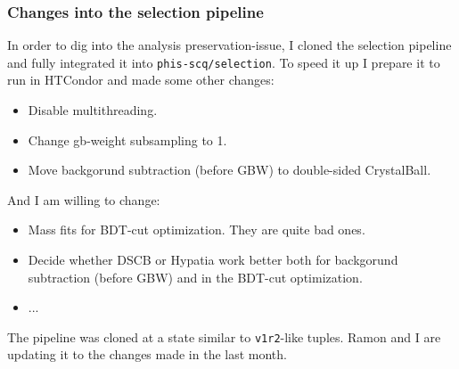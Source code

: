 \documentclass[9pt,xcolor={table,svgnames},aspectratio=43]{beamer}
\begin{document}
\begin{frame}
\frametitle{Changes into the selection pipeline}

In order to dig into the analysis preservation-issue, I cloned the selection
pipeline and fully integrated it into \texttt{phis-scq/selection}. To speed it
up I prepare it to run in HTCondor and made some other changes:
\begin{itemize}
  \item Disable multithreading.
  \item Change gb-weight subsampling to 1.
  \item Move backgorund subtraction (before GBW) to double-sided CrystalBall.
\end{itemize}

\pause

And I am willing to change:
\begin{itemize}
  \item Mass fits for BDT-cut optimization. They are quite bad ones.
  \item Decide whether DSCB or Hypatia work better both for backgorund 
    subtraction (before GBW) and in the BDT-cut optimization.
  \item ...
\end{itemize}

\vfill

The pipeline was cloned at a state similar to \texttt{v1r2}-like tuples.
Ramon and I are updating it to the changes made in the last month.

\end{frame}
\end{document}
